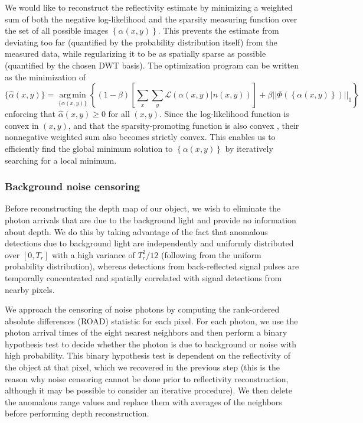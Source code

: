 We would like to reconstruct the reflectivity estimate by minimizing a weighted sum of both the negative log-likelihood and the sparsity measuring function over the set of all possible images $\left\{\alpha(x,y)\right\}$. This prevents the estimate from deviating too far (quantified by the probability distribution itself) from the measured data, while regularizing it to be as spatially sparse as possible (quantified by the chosen DWT basis). The optimization program can be written as the minimization of
\begin{equation}
\{ \hat{\alpha}(x,y) \} = \underset{\{\alpha(x,y)\}}{\operatorname{arg\,min}} \left\{ (1 - \beta) \left[ \sum_x \sum_y \mathcal{L}( \alpha(x,y) | n(x,y) ) \right] + \beta || \Phi\left(\left\{ \alpha(x,y) \right\}\right) ||_1 \right\}
\end{equation}
enforcing that $\hat{\alpha}(x,y) \geq 0$ for all $(x,y)$. Since the log-likelihood function is convex in $(x,y)$, and that the sparsity-promoting function is also convex \cite{boyd-convex}, their nonnegative weighted sum also becomes strictly convex. This enables us to efficiently find the global minimum solution to $\left\{ \alpha(x,y) \right\}$ by iteratively searching for a local minimum.

\subsubsection{Background noise censoring}

Before reconstructing the depth map of our object, we wish to eliminate the photon arrivals that are due to the background light and provide no information about depth. We do this by taking advantage of the fact that anomalous detections due to background light are independently and uniformly distributed over $[0, T_r]$ with a high variance of $T_r^2/12$ (following from the uniform probability distribution), whereas detections from back-reflected signal pulses are temporally concentrated and spatially correlated with signal detections from nearby pixels.

We approach the censoring of noise photons by computing the rank-ordered absolute differences (ROAD) statistic \cite{garnett-universal} for each pixel. For each photon, we use the photon arrival times of the eight nearest neighbors and then perform a binary hypothesis test to decide whether the photon is due to background or noise with high probability. This binary hypothesis test is dependent on the reflectivity of the object at that pixel, which we recovered in the previous step (this is the reason why noise censoring cannot be done prior to reflectivity reconstruction, although it may be possible to consider an iterative procedure). We then delete the anomalous range values and replace them with averages of the neighbors before performing depth reconstruction.

